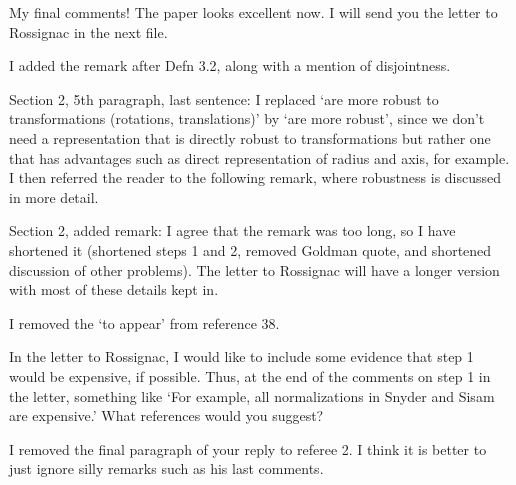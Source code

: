 My final comments!  The paper looks excellent now.
I will send you the letter to Rossignac in the next file.

I added the remark after Defn 3.2, along with a mention of disjointness.

Section 2, 5th paragraph, last sentence: I replaced 
	`are more robust to transformations (rotations, translations)'
	by `are more robust',
	since we don't need a representation that is directly robust
	to transformations but rather one that has advantages such
	as direct representation of radius and axis, for example.
	I then referred the reader to the following remark, where
	robustness is discussed in more detail.

Section 2, added remark:
	I agree that the remark was too long, so I have shortened it
	(shortened steps 1 and 2, removed Goldman quote, and shortened
	discussion of other problems).
	The letter to Rossignac will have a longer version with most 
	of these details kept in.

I removed the `to appear' from reference 38.

In the letter to Rossignac, I would like to include some evidence
that step 1 would be expensive, if possible.
Thus, at the end of the comments on step 1 in the letter, something like
`For example, all normalizations in Snyder and Sisam
are expensive.'  What references would you suggest?

I removed the final paragraph of your reply to referee 2.
I think it is better to just ignore silly remarks such as his last comments.

